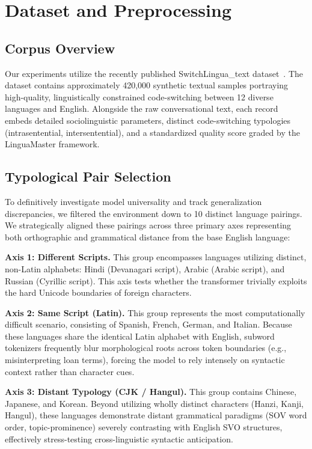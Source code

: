 \documentclass[sigconf,nonacm]{acmart}
\begin{document}
\section{Dataset and Preprocessing}

\subsection{Corpus Overview}
Our experiments utilize the recently published SwitchLingua\_text dataset~\cite{xie2025switchlingua}. The dataset contains approximately 420,000 synthetic textual samples portraying high-quality, linguistically constrained code-switching between 12 diverse languages and English. Alongside the raw conversational text, each record embeds detailed sociolinguistic parameters, distinct code-switching typologies (intrasentential, intersentential), and a standardized quality score graded by the LinguaMaster framework.

\subsection{Typological Pair Selection}
To definitively investigate model universality and track generalization discrepancies, we filtered the environment down to 10 distinct language pairings. We strategically aligned these pairings across three primary axes representing both orthographic and grammatical distance from the base English language:

\textbf{Axis 1: Different Scripts.}
This group encompasses languages utilizing distinct, non-Latin alphabets: Hindi (Devanagari script), Arabic (Arabic script), and Russian (Cyrillic script). This axis tests whether the transformer trivially exploits the hard Unicode boundaries of foreign characters.

\textbf{Axis 2: Same Script (Latin).}
This group represents the most computationally difficult scenario, consisting of Spanish, French, German, and Italian. Because these languages share the identical Latin alphabet with English, subword tokenizers frequently blur morphological roots across token boundaries (e.g., misinterpreting loan terms), forcing the model to rely intensely on syntactic context rather than character cues.

\textbf{Axis 3: Distant Typology (CJK / Hangul).}
This group contains Chinese, Japanese, and Korean. Beyond utilizing wholly distinct characters (Hanzi, Kanji, Hangul), these languages demonstrate distant grammatical paradigms (SOV word order, topic-prominence) severely contrasting with English SVO structures, effectively stress-testing cross-linguistic syntactic anticipation.
\end{document}
